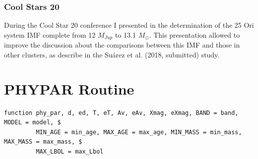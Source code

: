 \documentclass[12pt]{article}
\begin{document}
\subsubsection{Cool Stars 20}
\label{sec:CS20}
During the Cool Star 20 conference I presented in \citet{Suarez2018} the determination of the 25 Ori system IMF complete from 12 $M_{Jup}$ to 13.1 $M_\odot$. This presentation allowed to improve the discussion about the comparisons between this IMF and those in other clusters, as describe in the Su\'arez et al. (2018, submitted) study.

\section{PHYPAR Routine}
\label{sec_app:phypar}
{\scriptsize
\begin{Verbatim}[tabsize=4]
function phy_par, d, ed, T, eT, Av, eAv, Xmag, eXmag, BAND = band, MODEL = model, $
		 MIN_AGE = min_age, MAX_AGE = max_age, MIN_MASS = min_mass, MAX_MASS = max_mass, $
		 MAX_LBOL = max_Lbol


\end{Verbatim}}
\end{document}

